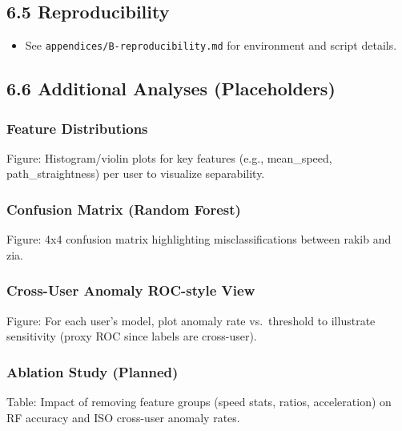 \documentclass[
  11pt,
  a4paper,
]{article}
\providecommand{\tightlist}{%
  \setlength{\itemsep}{0pt}\setlength{\parskip}{0pt}}
\begin{document}
\subsection{6.5 Reproducibility}\label{reproducibility}

\begin{itemize}
\tightlist
\item
  See \texttt{appendices/B-reproducibility.md} for environment and
  script details.
\end{itemize}

\subsection{6.6 Additional Analyses
(Placeholders)}\label{additional-analyses-placeholders}

\subsubsection{Feature Distributions}\label{feature-distributions}

Figure: Histogram/violin plots for key features (e.g., mean\_speed,
path\_straightness) per user to visualize separability.

\subsubsection{Confusion Matrix (Random
Forest)}\label{confusion-matrix-random-forest}

Figure: 4x4 confusion matrix highlighting misclassifications between
rakib and zia.

\subsubsection{Cross-User Anomaly ROC-style
View}\label{cross-user-anomaly-roc-style-view}

Figure: For each user's model, plot anomaly rate vs.~threshold to
illustrate sensitivity (proxy ROC since labels are cross-user).

\subsubsection{Ablation Study (Planned)}\label{ablation-study-planned}

Table: Impact of removing feature groups (speed stats, ratios,
acceleration) on RF accuracy and ISO cross-user anomaly rates.

\newpage
\thispagestyle{plain}
\end{document}
